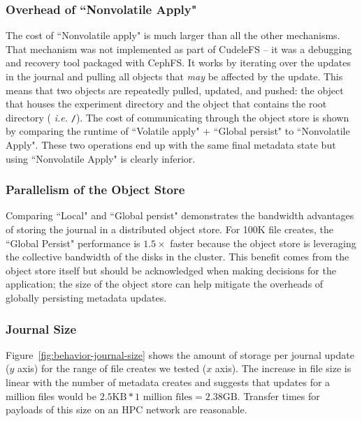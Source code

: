 \subsubsection{Overhead of ``Nonvolatile Apply"} The cost of ``Nonvolatile
apply" is much larger than all the other mechanisms.  That mechanism was not
implemented as part of CudeleFS -- it was a debugging and recovery tool packaged
with CephFS. It works by iterating over the updates in the journal and pulling
all objects that {\it may} be affected by the update.  This means that two
objects are repeatedly pulled, updated, and pushed: the object that houses the
experiment directory and the object that contains the root directory ({\it
i.e.} \texttt{/}).  The cost of communicating through the object store is shown
by comparing the runtime of ``Volatile apply" + ``Global persist" to
``Nonvolatile Apply". These two operations end up with the same final metadata
state but using ``Nonvolatile Apply" is clearly inferior.

\subsubsection{Parallelism of the Object Store} Comparing ``Local" and ``Global
persist" demonstrates the bandwidth advantages of storing the journal in a
distributed object store. For 100K file creates, the ``Global Persist"
performance is \(1.5\times\) faster because the object store is leveraging the
collective bandwidth of the disks in the cluster. This benefit comes from the
object store itself but should be acknowledged when making decisions for the
application; the size of the object store can help mitigate the overheads of
globally persisting metadata updates.

\subsubsection{Journal Size} Figure~\ref{fig:behavior-journal-size} shows the
amount of storage per journal update (\(y\) axis) for the range of file creates
we tested (\(x\) axis). The increase in file size is linear with the number of
metadata creates and suggests that updates for a million files would be
\(2.5\text{KB}*1\text{ million files} = 2.38\text{GB}\). Transfer times for
payloads of this size on an HPC network are reasonable.\\

